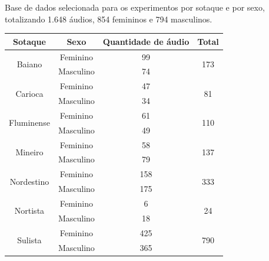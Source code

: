 \begin{quadro}[h]
\caption{Base de dados selecionada para os experimentos por sotaque e por sexo, totalizando 1.648 áudios, 854 femininos e 794 masculinos.} \label{Tabela_resumo_sotaque}
\centering
\begin{tabular}{|c|c|c|c|}
\hline
\textbf{Sotaque}            & \textbf{Sexo} & \textbf{Quantidade de áudio} & \textbf{Total}       \\ \hline
\multirow{2}{*}{Baiano}   & Feminino      & 99                            & \multirow{2}{*}{173}  \\ \cline{2-3}
                            & Masculino     & 74                           &                     \\ \hline
\multirow{2}{*}{Carioca}     & Feminino      & 47                          & \multirow{2}{*}{81} \\ \cline{2-3}
                            & Masculino     & 34                           &                      \\ \hline
\multirow{2}{*}{Fluminense}    & Feminino      & 61                           & \multirow{2}{*}{110} \\ \cline{2-3}
                            & Masculino     & 49                           &                      \\ \hline
\multirow{2}{*}{Mineiro}    & Feminino      & 58                           & \multirow{2}{*}{137}  \\ \cline{2-3}
                            & Masculino     & 79                           &                      \\ \hline
\multirow{2}{*}{Nordestino} & Feminino      & 158                           & \multirow{2}{*}{333} \\ \cline{2-3}
                            & Masculino     & 175                           &                      \\ \hline
\multirow{2}{*}{Nortista} & Feminino      & 6                          & \multirow{2}{*}{24} \\ \cline{2-3}
                            & Masculino     & 18                          &                      \\ \hline
\multirow{2}{*}{Sulista}    & Feminino      & 425                          & \multirow{2}{*}{790} \\ \cline{2-3}
                            & Masculino     & 365                          &                      \\ \hline
\end{tabular}
\end{quadro}


